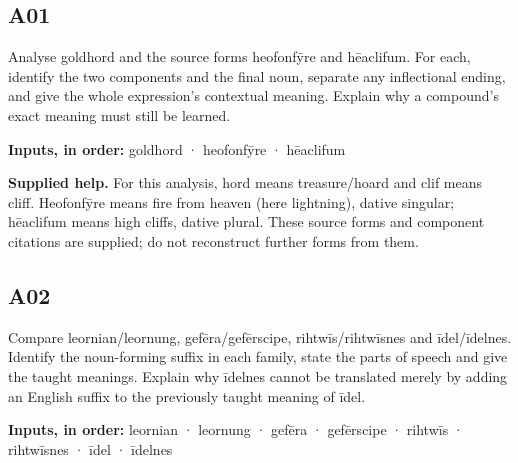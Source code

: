 \par\begin{minipage}{\linewidth}\raggedright
\subsection*{A01}

Analyse goldhord and the source forms heofonfȳre and hēaclifum. For each, identify the two components and the final noun, separate any inflectional ending, and give the whole expression’s contextual meaning. Explain why a compound’s exact meaning must still be learned.

\textbf{Inputs, in order:} goldhord · heofonfȳre · hēaclifum

\end{minipage}\par\addvspace{4pt}

\textbf{Supplied help.} For this analysis, hord means treasure/\allowbreak{}hoard and clif means cliff. Heofonfȳre means fire from heaven (here lightning), dative singular; hēaclifum means high cliffs, dative plural. These source forms and component citations are supplied; do not reconstruct further forms from them.

\par\begin{minipage}{\linewidth}\raggedright
\subsection*{A02}

Compare leornian/\allowbreak{}leornung, gefēra/\allowbreak{}gefērscipe, rihtwīs/\allowbreak{}rihtwīsnes and īdel/\allowbreak{}īdelnes. Identify the noun-forming suffix in each family, state the parts of speech and give the taught meanings. Explain why īdelnes cannot be translated merely by adding an English suffix to the previously taught meaning of īdel.

\textbf{Inputs, in order:} leornian · leornung · gefēra · gefērscipe · rihtwīs · rihtwīsnes · īdel · īdelnes

\end{minipage}\par\addvspace{4pt}

